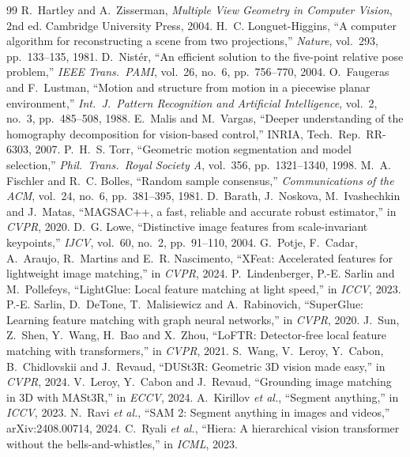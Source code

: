 \documentclass[journal]{IEEEtran}
\begin{document}
\begin{thebibliography}{99}\small
{} R.~Hartley and A.~Zisserman, \emph{Multiple View Geometry in Computer Vision}, 2nd ed. Cambridge University Press, 2004.
 H.~C. Longuet-Higgins, ``A computer algorithm for reconstructing a scene from two projections,'' \emph{Nature}, vol.~293, pp.~133--135, 1981.
 D.~Nist\'er, ``An efficient solution to the five-point relative pose problem,'' \emph{IEEE Trans.\ PAMI}, vol.~26, no.~6, pp.~756--770, 2004.
 O.~Faugeras and F.~Lustman, ``Motion and structure from motion in a piecewise planar environment,'' \emph{Int.\ J.\ Pattern Recognition and Artificial Intelligence}, vol.~2, no.~3, pp.~485--508, 1988.
 E.~Malis and M.~Vargas, ``Deeper understanding of the homography decomposition for vision-based control,'' INRIA, Tech.\ Rep.\ RR-6303, 2007.
 P.~H.~S. Torr, ``Geometric motion segmentation and model selection,'' \emph{Phil.\ Trans.\ Royal Society A}, vol.~356, pp.~1321--1340, 1998.
 M.~A. Fischler and R.~C. Bolles, ``Random sample consensus,'' \emph{Communications of the ACM}, vol.~24, no.~6, pp.~381--395, 1981.
 D.~Barath, J.~Noskova, M.~Ivashechkin and J.~Matas, ``MAGSAC++, a fast, reliable and accurate robust estimator,'' in \emph{CVPR}, 2020.
 D.~G. Lowe, ``Distinctive image features from scale-invariant keypoints,'' \emph{IJCV}, vol.~60, no.~2, pp.~91--110, 2004.
 G.~Potje, F.~Cadar, A.~Araujo, R.~Martins and E.~R. Nascimento, ``XFeat: Accelerated features for lightweight image matching,'' in \emph{CVPR}, 2024.
 P.~Lindenberger, P.-E. Sarlin and M.~Pollefeys, ``LightGlue: Local feature matching at light speed,'' in \emph{ICCV}, 2023.
 P.-E. Sarlin, D.~DeTone, T.~Malisiewicz and A.~Rabinovich, ``SuperGlue: Learning feature matching with graph neural networks,'' in \emph{CVPR}, 2020.
 J.~Sun, Z.~Shen, Y.~Wang, H.~Bao and X.~Zhou, ``LoFTR: Detector-free local feature matching with transformers,'' in \emph{CVPR}, 2021.
 S.~Wang, V.~Leroy, Y.~Cabon, B.~Chidlovskii and J.~Revaud, ``DUSt3R: Geometric 3D vision made easy,'' in \emph{CVPR}, 2024.
 V.~Leroy, Y.~Cabon and J.~Revaud, ``Grounding image matching in 3D with MASt3R,'' in \emph{ECCV}, 2024.
 A.~Kirillov \emph{et al.}, ``Segment anything,'' in \emph{ICCV}, 2023.
 N.~Ravi \emph{et al.}, ``SAM 2: Segment anything in images and videos,'' arXiv:2408.00714, 2024.
 C.~Ryali \emph{et al.}, ``Hiera: A hierarchical vision transformer without the bells-and-whistles,'' in \emph{ICML}, 2023.

\end{thebibliography}
\end{document}
